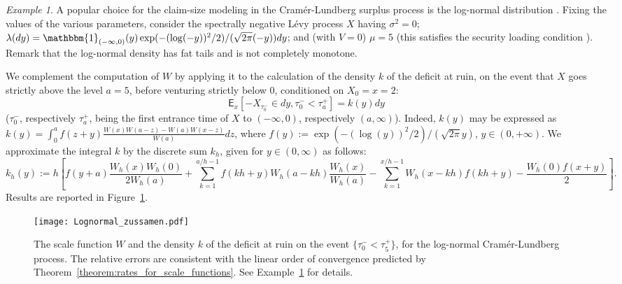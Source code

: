 \documentclass[pdftex,oneside,11pt,reqno]{amsart}
\theoremstyle{definition}
\theoremstyle{theorem}
\theoremstyle{remark}
\newtheorem{example}{Example}[section]
\numberwithin{equation}{section}
\numberwithin{definition}{section}
\begin{document}
\begin{example}\label{example:log-normal}
A popular choice for the claim-size modeling in the Cram\'er-Lundberg surplus process is the log-normal distribution \cite[Paragraph I.2.b, Example 2.8]{asmussen}. Fixing the values of the various parameters,  consider the spectrally negative L\'evy process $X$ having ${\sigma^2}=0$; ${\lambda}(dy)=\mathbbm{1}_{(-\infty,0)}(y)\exp(-(\log(-y))^2/2)/(\sqrt{2\pi}(-y))dy$; and (with $V=0$) $\mu=5$ (this satisfies the security loading condition \cite[Section~1.2]{gerber_shiu}). Remark that the log-normal density has fat tails and is not completely monotone.

We complement the computation of ${W}$ by applying it to the calculation of the density $k$ of the deficit at ruin, on the event that $X$ goes strictly above the level $a=5$, before venturing strictly below $0$, conditioned on $X_0=x=2$: $${\mathsf E}_x[-X_{\tau_0^-}\in dy,\tau_0^-<\tau_a^+]=k(y)dy$$ ($\tau_0^-$, respectively $\tau_a^+$, being the first entrance time of $X$ to $(-\infty,0)$, respectively $(a,\infty)$). Indeed, $k(y)$ may be expressed as \cite[Theorem 5.5]{gerber_shiu} $k(y)=\int_0^af(z+y)\frac{{W}(x){W}(a-z)-{W}(a){W}(x-z)}{{W}(a)}dz$, where $f(y):=\exp(-(\log(y))^2/2)/(\sqrt{2\pi}y)$, $y\in (0,+\infty)$. We approximate the integral $k$ by the discrete sum $k_h$, given for $y\in (0,\infty)$ as follows: \footnotesize $$k_h(y):=h\left[f(y+a)\frac{{W}_h(x){W}_h(0)}{2{W}_h(a)}+\sum_{k=1}^{a/h-1}f(kh+y){W}_h(a-kh)\frac{{W}_h(x)}{{W}_h(a)}-\sum_{k=1}^{x/h-1}{W}_h(x-kh)f(kh+y)-\frac{{W}_h(0)f(x+y)}{2}\right].$$ \normalsize  Results are reported in Figure~\ref{figure:log-normal}. 

\begin{figure}
                \texttt{[image: Lognormal\_zussamen.pdf]}
\caption{The scale function ${W}$ and the density $k$ of the deficit at ruin on the event $\{\tau_0^-<\tau_5^+\}$, for the log-normal Cram\'er-Lundberg process. The relative errors are consistent with the linear order of convergence predicted by Theorem~\ref{theorem:rates_for_scale_functions}. See Example~\ref{example:log-normal} for details.}\label{figure:log-normal}
\end{figure}

\end{example}
\end{document}
